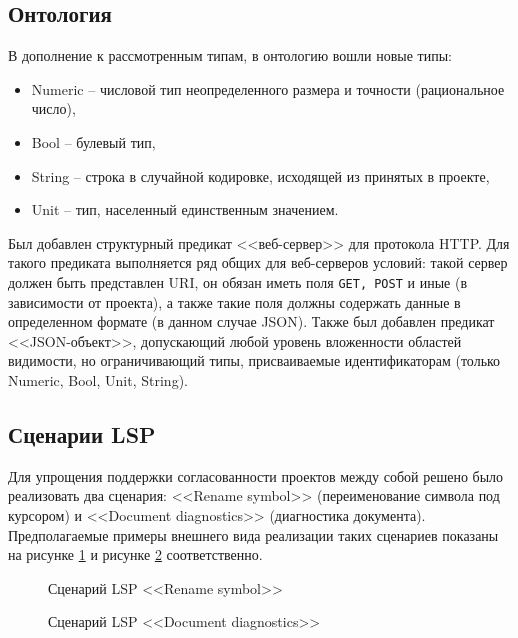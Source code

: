 \subsection{Онтология}

В дополнение к рассмотренным типам, в онтологию вошли новые типы:
\begin{itemize}
    \item Numeric -- числовой тип неопределенного размера и точности (рациональное число),
    \item Bool -- булевый тип,
    \item String -- строка в случайной кодировке, исходящей из принятых в проекте,
    \item Unit -- тип, населенный единственным значением.
\end{itemize}

Был добавлен структурный предикат <<веб-сервер>> для протокола HTTP. Для такого предиката выполняется ряд
общих для веб-серверов условий: такой сервер должен быть представлен URI, он обязан иметь поля \texttt{GET, POST} и иные (в зависимости
от проекта), а также такие поля должны содержать данные в определенном формате (в данном случае JSON). Также был добавлен предикат
<<JSON-объект>>, допускающий любой уровень вложенности областей видимости, но ограничивающий типы, присваиваемые идентификаторам (только
Numeric, Bool, Unit, String).

\subsection{Сценарии LSP}

Для упрощения поддержки согласованности проектов между собой решено было реализовать
два сценария: <<Rename symbol>> (переименование символа под курсором) и <<Document diagnostics>> (диагностика документа).
Предполагаемые примеры внешнего вида реализации таких сценариев показаны на рисунке \ref{fig:lsp-rename} и рисунке \ref{fig:lsp-diagnostics}
соответственно.

\begin{figure}[H]
    \centering
    \caption{Сценарий LSP <<Rename symbol>>}
    \label{fig:lsp-rename}
\end{figure}

\begin{figure}[H]
    \centering
    \caption{Сценарий LSP <<Document diagnostics>>}
    \label{fig:lsp-diagnostics}
\end{figure}

\clearpage
